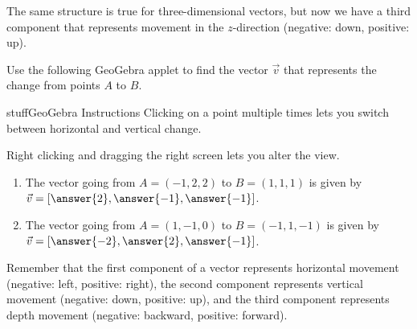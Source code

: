 \documentclass{ximera}
\begin{document}
The same structure is true for three-dimensional vectors, but now we have a third component that represents movement in the $z$-direction (negative: down, positive: up).

\begin{problem}
    Use the following GeoGebra applet to find the vector $\vec{v}$ that represents the change from points $A$ to $B$. 
    
    \begin{expandable}{stuff}{GeoGebra Instructions}
        Clicking on a point multiple times lets you switch between horizontal and vertical change. 
        
        Right clicking and dragging the right screen lets you alter the view.
    \end{expandable}

    \begin{center}
    \end{center}

    \begin{enumerate}
        \item The vector going from $A=(-1,2,2)$ to $B=(1,1,1)$ is given by $\vec{v}=[\answer{2},\answer{-1},\answer{-1}]$.
        \item The vector going from $A=(1,-1,0)$ to $B=(-1,1,-1)$ is given by $\vec{v}=[\answer{-2},\answer{2},\answer{-1}]$.
    \end{enumerate}
    \begin{feedback}
        Remember that the first component of a vector represents horizontal movement (negative: left, positive: right), the second component represents vertical movement (negative: down, positive: up), and the third component represents depth movement (negative: backward, positive: forward).
    \end{feedback}
\end{problem}
\end{document}
